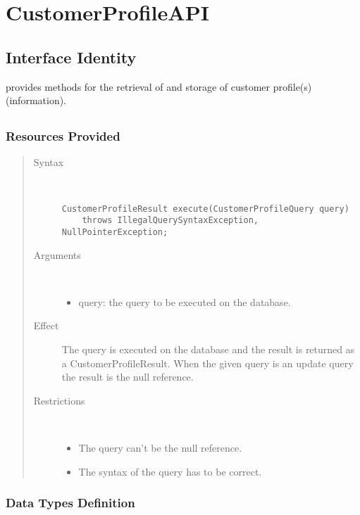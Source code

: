 \section{CustomerProfileAPI}
\label{api:customer-profile-api}

\subsection{Interface Identity}

\npar {} provides methods for the retrieval of and storage of
customer profile(s) (information).

\subsection{}

\subsubsection{Resources Provided}

\begin{quote}
	\begin{description}
		\item[Syntax] \
		\begin{verbatim}
CustomerProfileResult execute(CustomerProfileQuery query)
    throws IllegalQuerySyntaxException, NullPointerException;
		\end{verbatim}
		\item[Arguments] \
		\begin{itemize}
		  \item query: the query to be executed on the database. 
		\end{itemize}
		\item[Effect] The query is executed on the database and the result is returned
		as a CustomerProfileResult. When the given query is an update query the result is the
		null reference.
		\item[Restrictions] \
		\begin{itemize}
		  \item The query can't be the null reference.
		  \item The syntax of the query has to be correct.
		\end{itemize}
	\end{description} 
\end{quote}

\subsubsection{Data Types Definition}


